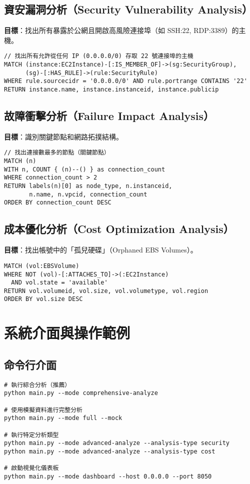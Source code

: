 \documentclass[11pt,a4paper]{ctexart}
\begin{document}
\subsection{資安漏洞分析（Security Vulnerability Analysis）}
\textbf{目標}：找出所有暴露於公網且開啟高風險連接埠（如 SSH:22, RDP:3389）的主機。

\begin{lstlisting}[language=Cypher,caption={尋找允許 0.0.0.0/0 存取 22 埠之主機}]
// 找出所有允許從任何 IP (0.0.0.0/0) 存取 22 號連接埠的主機
MATCH (instance:EC2Instance)-[:IS_MEMBER_OF]->(sg:SecurityGroup),
      (sg)-[:HAS_RULE]->(rule:SecurityRule)
WHERE rule.sourcecidr = '0.0.0.0/0' AND rule.portrange CONTAINS '22'
RETURN instance.name, instance.instanceid, instance.publicip
\end{lstlisting}

\subsection{故障衝擊分析（Failure Impact Analysis）}
\textbf{目標}：識別關鍵節點和網路拓撲結構。

\begin{lstlisting}[language=Cypher,caption={關鍵節點識別}]
// 找出連接數最多的節點（關鍵節點）
MATCH (n)
WITH n, COUNT { (n)--() } as connection_count
WHERE connection_count > 2
RETURN labels(n)[0] as node_type, n.instanceid, 
       n.name, n.vpcid, connection_count
ORDER BY connection_count DESC
\end{lstlisting}

\subsection{成本優化分析（Cost Optimization Analysis）}
\textbf{目標}：找出帳號中的「孤兒硬碟」（Orphaned EBS Volumes）。

\begin{lstlisting}[language=Cypher,caption={找出未連接至任何 EC2 的 EBS 磁碟}]
MATCH (vol:EBSVolume)
WHERE NOT (vol)-[:ATTACHES_TO]->(:EC2Instance)
  AND vol.state = 'available'
RETURN vol.volumeid, vol.size, vol.volumetype, vol.region
ORDER BY vol.size DESC
\end{lstlisting}

\section{系統介面與操作範例}
\subsection{命令行介面}
\begin{verbatim}
# 執行綜合分析（推薦）
python main.py --mode comprehensive-analyze

# 使用模擬資料進行完整分析
python main.py --mode full --mock

# 執行特定分析類型
python main.py --mode advanced-analyze --analysis-type security
python main.py --mode advanced-analyze --analysis-type cost

# 啟動視覺化儀表板
python main.py --mode dashboard --host 0.0.0.0 --port 8050
\end{verbatim}
\end{document}
